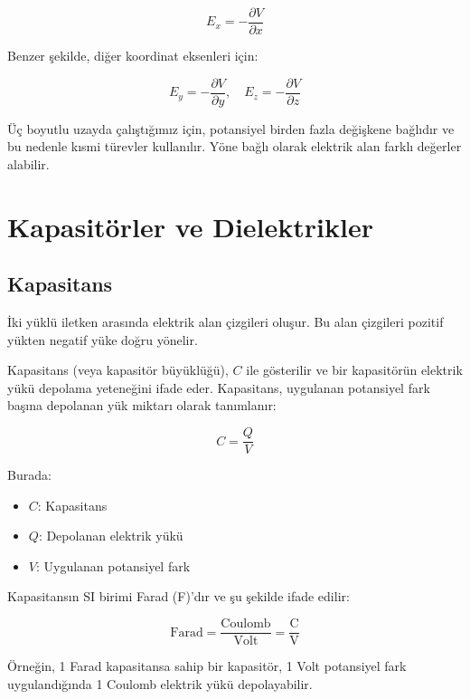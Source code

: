 \documentclass[12pt,a4paper]{fenbil}
\begin{document}
\begin{equation}
E_x = -\frac{\partial V}{\partial x}
\end{equation}

Benzer şekilde, diğer koordinat eksenleri için:

\begin{equation}
E_y = -\frac{\partial V}{\partial y}, \quad E_z = -\frac{\partial V}{\partial z}
\end{equation}

Üç boyutlu uzayda çalıştığımız için, potansiyel birden fazla değişkene bağlıdır ve bu nedenle kısmi türevler kullanılır. Yöne bağlı olarak elektrik alan farklı değerler alabilir.

\section{Kapasitörler ve Dielektrikler}

\subsection{Kapasitans}

İki yüklü iletken arasında elektrik alan çizgileri oluşur. Bu alan çizgileri pozitif yükten negatif yüke doğru yönelir.

Kapasitans (veya kapasitör büyüklüğü), $C$ ile gösterilir ve bir kapasitörün elektrik yükü depolama yeteneğini ifade eder. Kapasitans, uygulanan potansiyel fark başına depolanan yük miktarı olarak tanımlanır:

\begin{equation}
C = \frac{Q}{V}
\end{equation}

Burada:
\begin{itemize}
    \item $C$: Kapasitans
    \item $Q$: Depolanan elektrik yükü
    \item $V$: Uygulanan potansiyel fark
\end{itemize}

Kapasitansın SI birimi Farad (F)'dır ve şu şekilde ifade edilir:

\begin{equation}
\text{Farad} = \frac{\text{Coulomb}}{\text{Volt}} = \frac{\text{C}}{\text{V}}
\end{equation}

Örneğin, 1 Farad kapasitansa sahip bir kapasitör, 1 Volt potansiyel fark uygulandığında 1 Coulomb elektrik yükü depolayabilir.
\end{document}
